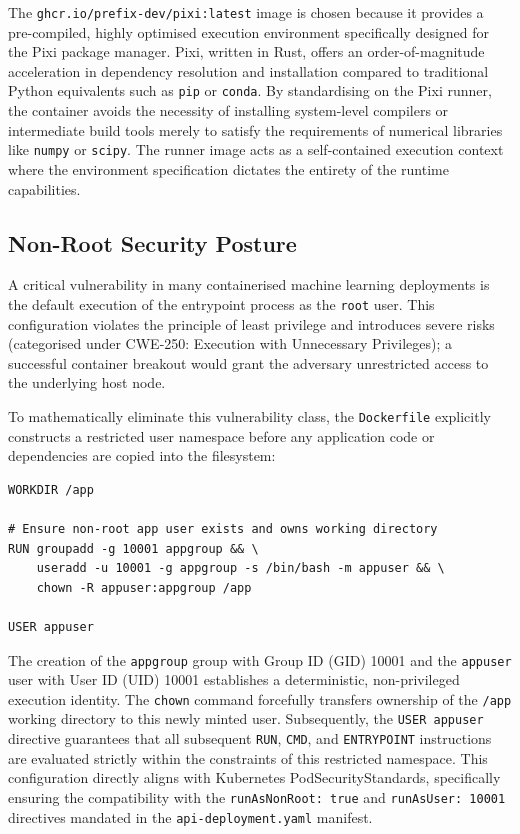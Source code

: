 The \texttt{ghcr.io/prefix-dev/pixi:latest} image is chosen because it provides a pre-compiled, highly optimised execution environment specifically designed for the Pixi package manager. Pixi, written in Rust, offers an order-of-magnitude acceleration in dependency resolution and installation compared to traditional Python equivalents such as \texttt{pip} or \texttt{conda}. By standardising on the Pixi runner, the container avoids the necessity of installing system-level compilers or intermediate build tools merely to satisfy the requirements of numerical libraries like \texttt{numpy} or \texttt{scipy}. The runner image acts as a self-contained execution context where the environment specification dictates the entirety of the runtime capabilities.

\subsection{Non-Root Security Posture}

A critical vulnerability in many containerised machine learning deployments is the default execution of the entrypoint process as the \texttt{root} user. This configuration violates the principle of least privilege and introduces severe risks (categorised under CWE-250: Execution with Unnecessary Privileges); a successful container breakout would grant the adversary unrestricted access to the underlying host node.

To mathematically eliminate this vulnerability class, the \texttt{Dockerfile} explicitly constructs a restricted user namespace before any application code or dependencies are copied into the filesystem:

\begin{verbatim}
WORKDIR /app

# Ensure non-root app user exists and owns working directory
RUN groupadd -g 10001 appgroup && \
    useradd -u 10001 -g appgroup -s /bin/bash -m appuser && \
    chown -R appuser:appgroup /app

USER appuser
\end{verbatim}

The creation of the \texttt{appgroup} group with Group ID (GID) 10001 and the \texttt{appuser} user with User ID (UID) 10001 establishes a deterministic, non-privileged execution identity. The \texttt{chown} command forcefully transfers ownership of the \texttt{/app} working directory to this newly minted user. Subsequently, the \texttt{USER appuser} directive guarantees that all subsequent \texttt{RUN}, \texttt{CMD}, and \texttt{ENTRYPOINT} instructions are evaluated strictly within the constraints of this restricted namespace. This configuration directly aligns with Kubernetes PodSecurityStandards, specifically ensuring the compatibility with the \texttt{runAsNonRoot: true} and \texttt{runAsUser: 10001} directives mandated in the \texttt{api-deployment.yaml} manifest.

